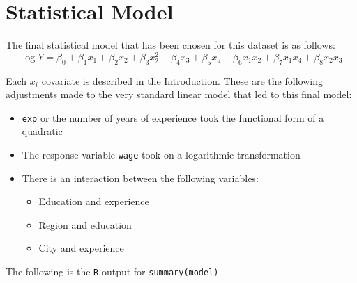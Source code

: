 \documentclass{article}
\begin{document}
  \section{Statistical Model} \label{final_model}
    The final statistical model that has been chosen for this dataset is as follows:
    \[
      \log{Y} = \beta_0 + \beta_1 x_1 + \beta_2 x_2 + \beta_3 x_2^2 + \beta_4 x_3 + \beta_5 x_5 + \beta_6 x_1 x_2 + \beta_7 x_1 x_4 + \beta_8 x_2 x_3
    \]

    Each $x_i$ covariate is described in the Introduction. These are the following
    adjustments made to the very standard linear model that led to this final model:
    \begin{itemize}
      \item
        \texttt{exp} or the number of years of
        experience took the functional form of a quadratic
      \item
        The response variable \texttt{wage} took on a logarithmic transformation
      \item
        There is an interaction between the following variables:
        \begin{itemize}
          \item Education and experience
          \item Region and education
          \item City and experience
        \end{itemize}
    \end{itemize}

    The following is the \texttt{R}
    output for \texttt{summary(model)}
\end{document}
